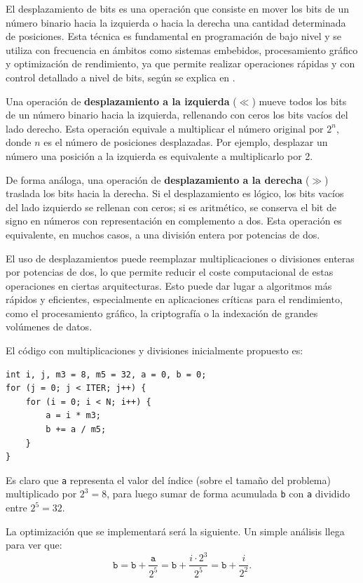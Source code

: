 \documentclass[11pt,a4paper,twoside]{article}
\theoremstyle{definition}
\begin{document}
	El desplazamiento de bits es una operación que consiste en mover los bits de un número binario hacia la izquierda o hacia la derecha una cantidad determinada de posiciones. Esta técnica es fundamental en programación de bajo nivel y se utiliza con frecuencia en ámbitos como sistemas embebidos, procesamiento gráfico y optimización de rendimiento, ya que permite realizar operaciones rápidas y con control detallado a nivel de bits, según se explica en \cite{burrell}.
	
	Una operación de \textbf{desplazamiento a la izquierda} ($\ll$) mueve todos los bits de un número binario hacia la izquierda, rellenando con ceros los bits vacíos del lado derecho. Esta operación equivale a multiplicar el número original por $2^n$, donde $n$ es el número de posiciones desplazadas. Por ejemplo, desplazar un número una posición a la izquierda es equivalente a multiplicarlo por 2.
	
	De forma análoga, una operación de \textbf{desplazamiento a la derecha} ($\gg$) traslada los bits hacia la derecha. Si el desplazamiento es {lógico}, los bits vacíos del lado izquierdo se rellenan con ceros; si es {aritmético}, se conserva el bit de signo en números con representación en complemento a dos. Esta operación es equivalente, en muchos casos, a una división entera por potencias de dos.
	
	El uso de desplazamientos puede reemplazar multiplicaciones o divisiones enteras por potencias de dos, lo que permite reducir el coste computacional de estas operaciones en ciertas arquitecturas. Esto puede dar lugar a algoritmos más rápidos y eficientes, especialmente en aplicaciones críticas para el rendimiento, como el procesamiento gráfico, la criptografía o la indexación de grandes volúmenes de datos.
	
	El código con multiplicaciones y divisiones inicialmente propuesto es:
	\begin{verbatim}
int i, j, m3 = 8, m5 = 32, a = 0, b = 0;
for (j = 0; j < ITER; j++) {
	for (i = 0; i < N; i++) {
		a = i * m3;
		b += a / m5;
	}
}
	\end{verbatim}

	Es claro que \texttt{a} representa el valor del índice (sobre el tamaño del problema) multiplicado por $2^3=8$, para luego sumar de forma acumulada \texttt{b} con \texttt{a} dividido entre $2^5=32$.

	La optimización que se implementará será la siguiente. Un simple análisis llega para ver que:
	\begin{equation}\label{eq:uno}
		\texttt{b} = \texttt{b} + \dfrac{\texttt{a}}{2^5} = \texttt{b} + \dfrac{i \cdot 2^3}{2^5} = \texttt{b} + \dfrac{i}{2^2}.
	\end{equation}
	
\end{document}
